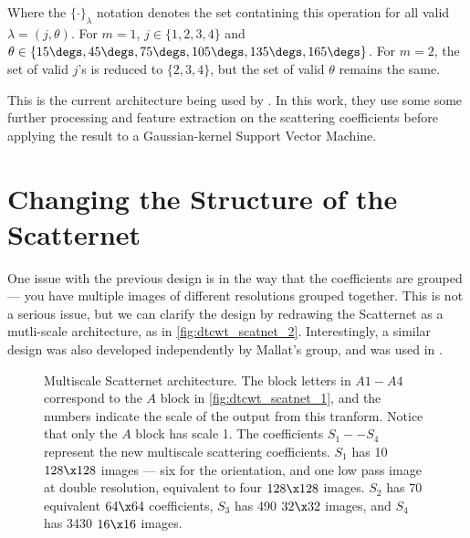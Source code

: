   Where the $\{\cdot\}_{\lambda}$ notation denotes the set contatining this
  operation for all valid $\lambda = (j, \theta)$. For $m=1$, $j \in
  \{1,2,3,4\}$ and $\theta \in \{15\degs, 45\degs, 75\degs, 105\degs, 135\degs,
  165\degs\}$. For $m=2$, the set of valid $j$'s is reduced to $\{2,3,4\}$,
  but the set of valid $\theta$ remains the same.
 

  This is the current architecture being used by
  \citet{singh_multi-resolution_2016}. In this work, they use some some 
  further processing and feature extraction on the scattering 
  coefficients before applying the result to a Gaussian-kernel Support Vector
  Machine.

\section{Changing the Structure of the Scatternet}
  One issue with the previous design is in the way that the coefficients are
  grouped --- you have multiple images of different resolutions grouped together.
  This is not a serious issue, but we can clarify the design by redrawing the
  Scatternet as a mutli-scale architecture, as in
  \autoref{fig:dtcwt_scatnet_2}. Interestingly, a similar design was also
  developed independently by Mallat's group, and was used in
  \citep{oyallon_deep_2015}.

  \begin{figure}
    \centering
      \vspace{1cm}
      \makebox[\textwidth][c]{%
        \resizebox{1.1\textwidth}{!}{}
      }
      \vspace{0.3cm}
      \caption[Multiscale Scatternet architecture]
              {Multiscale Scatternet architecture. The block letters in $A1 - A4$
              correspond to the $A$ block in \autoref{fig:dtcwt_scatnet_1}, and the
              numbers indicate the scale of the output from this tranform. Notice
              that only the $A$ block has scale 1. The coefficients $S_1 --
              S_4$ represent the new multiscale scattering coefficients. $S_1$
              has 10 $128\x 128$ images --- six for the orientation, and one
              low pass image at double resolution, equivalent to four $128\x
              128$ images. $S_2$ has 70 equivalent $64\x 64$ coefficients,
              $S_3$ has 490 $32\x 32$ images, and $S_4$ has 3430 $16\x 16$
              images.}
      \label{fig:dtcwt_scatnet_2}
  \end{figure}
  
